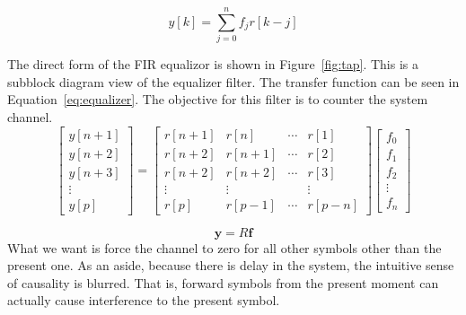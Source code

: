 \documentclass[]{article}
\begin{document}
\begin{equation}
\label{eq:equalizer}
y\left[k\right] = \sum_{j=0}^n f_jr\left[k-j\right]
\end{equation}

The direct form of the FIR equalizor is shown in Figure~\ref{fig:tap}.  This is a subblock diagram view of the equalizer filter.  The transfer function can be seen in Equation~\ref{eq:equalizer}.  The objective for this filter is to counter the system channel.  \\

\begin{equation}
\label{eq:equalizerVector}
\left[ \begin{array}{c}
 y \left[n+1\right] \\
 y \left[n+2\right] \\
 y \left[n+3\right] \\
\vdots  \\
y\left[ p \right] \end{array} \right] = 
\begin{bmatrix} 
r \left[ n+1\right]  & r[n] & \cdots & r\left[ 1 \right] \\ 
r \left[ n+2\right]  & r[n+1] & \cdots & r\left[ 2 \right] \\ 
r \left[ n+2\right]  & r[n+2] & \cdots & r\left[ 3 \right] \\ 
\vdots & \vdots & & \vdots \\
r \left[p \right] & r\left[ p-1 \right] & \cdots & r\left[ p-n \right]
\end{bmatrix}
 \left[ \begin{array}{c} f_0 \\ f_1 \\ f_2 \\ \vdots \\ f_n \end{array} \right]
\end{equation}

\begin{equation}
\label{eq:equalizerMatrix}
\mathbf{y} = R\mathbf{f}
\end{equation}
What we want is force the channel to zero for all other symbols other than the present one.  As an aside, because there is delay in the system, the intuitive sense of causality is blurred. That is, forward symbols from the present moment can actually cause interference to the present symbol.   \\
\end{document}
